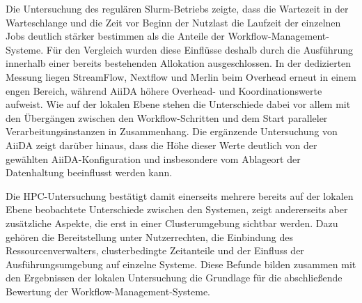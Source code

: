 Die Untersuchung des regulären Slurm-Betriebs zeigte, dass die
Wartezeit in der Warteschlange und die Zeit vor Beginn der Nutzlast
die Laufzeit der einzelnen Jobs deutlich stärker bestimmen als die
Anteile der Workflow-Management-Systeme. Für den Vergleich wurden
diese Einflüsse deshalb durch die Ausführung innerhalb einer
bereits bestehenden Allokation ausgeschlossen. In der dedizierten
Messung liegen StreamFlow, Nextflow und Merlin beim Overhead erneut
in einem engen Bereich, während AiiDA höhere Overhead- und
Koordinationswerte aufweist. Wie auf der lokalen Ebene stehen die
Unterschiede dabei vor allem mit den Übergängen zwischen den
Workflow-Schritten und dem Start paralleler Verarbeitungsinstanzen
in Zusammenhang. Die ergänzende Untersuchung von AiiDA zeigt
darüber hinaus, dass die Höhe dieser Werte deutlich von
der gewählten AiiDA-Konfiguration und insbesondere vom Ablageort der
Datenhaltung beeinflusst werden kann.

Die HPC-Untersuchung bestätigt damit einerseits mehrere bereits auf
der lokalen Ebene beobachtete Unterschiede zwischen den Systemen,
zeigt andererseits aber zusätzliche Aspekte, die erst in
einer Clusterumgebung sichtbar werden. Dazu gehören die
Bereitstellung unter Nutzerrechten, die Einbindung des
Ressourcenverwalters, clusterbedingte Zeitanteile und der Einfluss
der Ausführungsumgebung auf einzelne Systeme. Diese Befunde bilden
zusammen mit den Ergebnissen der lokalen Untersuchung die Grundlage
für die abschließende Bewertung der Workflow-Management-Systeme.
